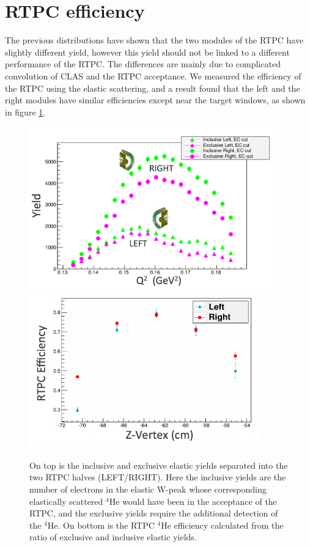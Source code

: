 \section{RTPC efficiency}
The previous distributions have shown that the two modules of the RTPC have 
slightly different yield, however this yield should not be linked to a different 
performance of the RTPC. The differences are mainly due to complicated 
convolution of CLAS and the RTPC acceptance. We measured the efficiency of the 
RTPC using the elastic scattering, and a result found that the left and the 
right modules have similar efficiencies except near the target windows, as 
shown in figure \ref{fig:rtpc_eff}.

\begin{figure}[tbp]
\centering
\hspace{+0.3in}\includegraphics[width=10.5cm]{fig_rtpc/tpceffyields.png}
\includegraphics[width=10cm]{fig_rtpc/tpceff.png}
\caption{On top is the inclusive and exclusive elastic yields separated into
 the two RTPC halves (LEFT/RIGHT).  Here the inclusive yields are the
 number of electrons in the elastic W-peak
 whose corresponding elastically scattered $^4$He would have been in the
 acceptance of the RTPC, and the exclusive yields require the additional
 detection of the $^4$He. On
 bottom is the RTPC $^4$He efficiency calculated from the ratio of exclusive
 and inclusive elastic yields.
 \label{fig:rtpc_eff}}
 \end{figure}


